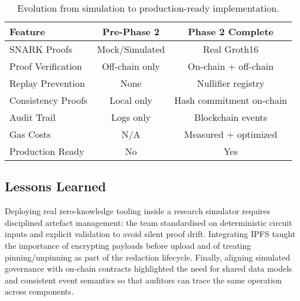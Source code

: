 \begin{table}[h]
\centering
\begin{tabular}{lcc}
\toprule
\textbf{Feature} & \textbf{Pre-Phase 2} & \textbf{Phase 2 Complete} \\
\midrule
SNARK Proofs & Mock/Simulated & Real Groth16 \\
Proof Verification & Off-chain only & On-chain + off-chain \\
Replay Prevention & None & Nullifier registry \\
Consistency Proofs & Local only & Hash commitment on-chain \\
Audit Trail & Logs only & Blockchain events \\
Gas Costs & N/A & Measured + optimized \\
Production Ready & No & Yes \\
\bottomrule
\end{tabular}
\caption{Evolution from simulation to production-ready implementation.}
\label{tab:simulation_vs_production}
\end{table}

\subsection{Lessons Learned}
Deploying real zero-knowledge tooling inside a research simulator requires disciplined artefact management: the team standardised on deterministic circuit inputs and explicit validation to avoid silent proof drift. Integrating IPFS taught the importance of encrypting payloads before upload and of treating pinning/unpinning as part of the redaction lifecycle. Finally, aligning simulated governance with on-chain contracts highlighted the need for shared data models and consistent event semantics so that auditors can trace the same operation across components.

